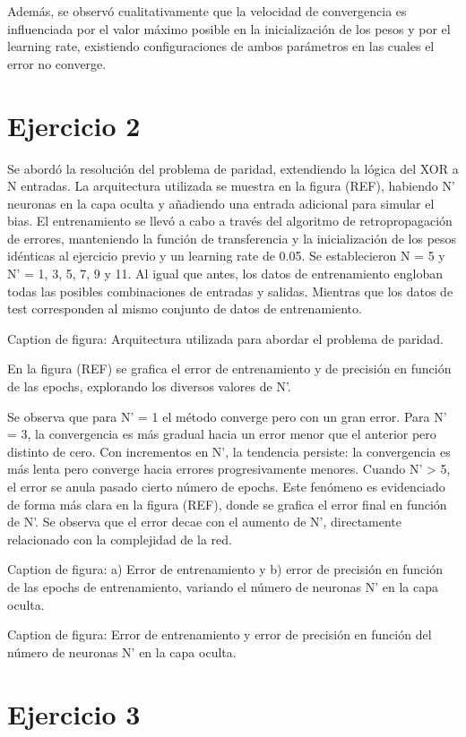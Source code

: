 \documentclass[aps,prb,twocolumn,superscriptaddress,floatfix,longbibliography]{revtex4-2}
\newcounter{para}
\begin{document}
Además, se observó cualitativamente que la velocidad de convergencia es influenciada por el valor máximo posible en la inicialización de los pesos y por el learning rate, existiendo configuraciones de ambos parámetros en las cuales el error no converge.

\section*{Ejercicio 2}


Se abordó la resolución del problema de paridad, extendiendo la lógica del XOR a N entradas. La arquitectura utilizada se muestra en la figura (REF), habiendo N' neuronas en la capa oculta y añadiendo una entrada adicional para simular el bias. El entrenamiento se llevó a cabo a través del algoritmo de retropropagación de errores, manteniendo la función de transferencia y la inicialización de los pesos idénticas al ejercicio previo y un learning rate de 0.05. Se establecieron N = 5 y N' = 1, 3, 5, 7, 9 y 11. Al igual que antes, los datos de entrenamiento engloban todas las posibles combinaciones de entradas y salidas. Mientras que los datos de test corresponden al mismo conjunto de datos de entrenamiento.

Caption de figura: Arquitectura utilizada para abordar el problema de paridad.

En la figura (REF) se grafica el error de entrenamiento y de precisión en función de las epochs, explorando los diversos valores de N'.

Se observa que para N' = 1 el método converge pero con un gran error. Para N' = 3, la convergencia es más gradual hacia un error menor que el anterior pero distinto de cero. Con incrementos en N', la tendencia persiste: la convergencia es más lenta pero converge hacia errores progresivamente menores. Cuando N’ > 5, el error se anula pasado cierto número de epochs. Este fenómeno es evidenciado de forma más clara en la figura (REF), donde se grafica el error final en función de N'. Se observa que el error decae con el aumento de N', directamente relacionado con la complejidad de la red.

Caption de figura: a) Error de entrenamiento y b) error de precisión en función de las epochs de entrenamiento, variando el número de neuronas N’ en la capa oculta.

Caption de figura: Error de entrenamiento y error de precisión en función del número de neuronas N' en la capa oculta.


\section*{Ejercicio 3}
\end{document}
